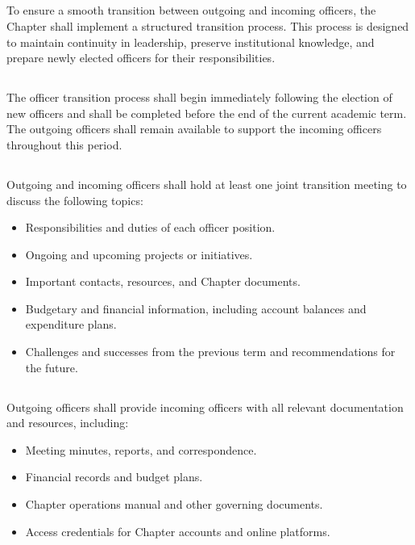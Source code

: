 \documentclass[10pt, oneside]{article}
\begin{document}
\subsection{}
To ensure a smooth transition between outgoing and incoming officers, the Chapter shall implement a structured transition process. This process is designed to maintain continuity in leadership, preserve institutional knowledge, and prepare newly elected officers for their responsibilities.

\subsection{}
The officer transition process shall begin immediately following the election of new officers and shall be completed before the end of the current academic term. The outgoing officers shall remain available to support the incoming officers throughout this period.

\subsection{}
Outgoing and incoming officers shall hold at least one joint transition meeting to discuss the following topics:
\begin{itemize}
    \item Responsibilities and duties of each officer position.
    \item Ongoing and upcoming projects or initiatives.
    \item Important contacts, resources, and Chapter documents.
    \item Budgetary and financial information, including account balances and expenditure plans.
    \item Challenges and successes from the previous term and recommendations for the future.
\end{itemize}

\subsection{}
Outgoing officers shall provide incoming officers with all relevant documentation and resources, including:
\begin{itemize}
    \item Meeting minutes, reports, and correspondence.
    \item Financial records and budget plans.
    \item Chapter operations manual and other governing documents.
    \item Access credentials for Chapter accounts and online platforms.
\end{itemize}
\end{document}

